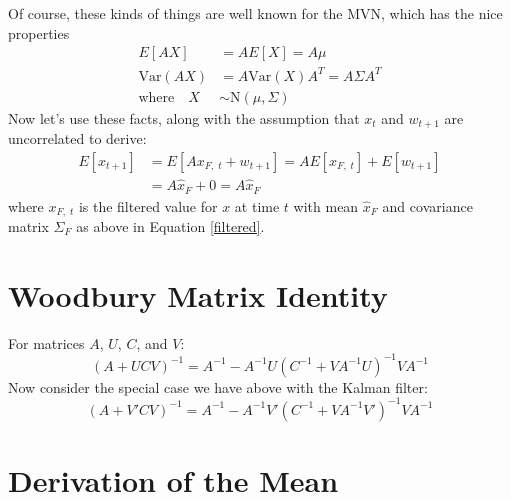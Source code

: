\documentclass[a4paper,12pt]{article}
\begin{document}
Of course, these kinds of things are well known for the 
MVN, which has the nice properties
\begin{align*}
    E[AX] &= A E[X] = A \mu \\
    \text{Var}(AX) &= A \text{Var}(X) A^T = A\Sigma A^T \\
    \text{where} \quad X &\sim \text{N}(\mu, \Sigma)
\end{align*}
Now let's use these facts, along with the assumption
that $x_t$ and $w_{t+1}$ are uncorrelated to derive:
\begin{align*}
    E[x_{t+1}] &= E\left[Ax_{F,\; t} + w_{t+1} \right] 
                = AE\left[x_{F,\; t}\right] + E\left[w_{t+1} 
                \right] \\
        &= A \hat{x}_F + 0 = A \hat{x}_F
\end{align*}
where $x_{F, \; t}$ is the filtered value for $x$ at time
$t$ with mean $\hat{x}_F$ and covariance matrix 
$\Sigma_F$ as above in Equation \ref{filtered}.












\newpage
\appendix

\section{Woodbury Matrix Identity}

For matrices $A$, $U$, $C$, and $V$:
\begin{equation}
    (A+UCV)^{-1} = A^{-1} - A^{-1} U(C^{-1} + VA^{-1}U)^{-1}
	VA^{-1}
\end{equation}
Now consider the special case we have above with the
Kalman filter:
\begin{equation}
    \label{special}
    (A + V'CV)^{-1} = A^{-1} - A^{-1} V'(C^{-1} + VA^{-1}V')^{-1}
	VA^{-1}
\end{equation}

\section{Derivation of the Mean}
\end{document}
